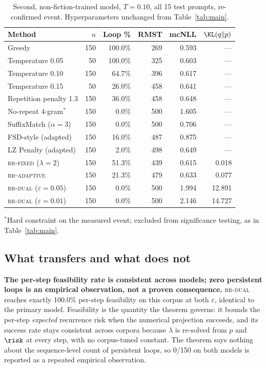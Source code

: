 \begin{table}[ht]
\centering
\caption{Second, non-fiction-trained model, $T{=}0.10$, all 15 test prompts, re-confirmed event. Hyperparameters unchanged from Table~\ref{tab:main}.}
\label{tab:generalization}
\begin{tabular}{@{}lrrrrr@{}}
\toprule
Method & $n$ & Loop \% & RMST & mcNLL & $\KL(q\Vert p)$ \\
\midrule
Greedy                      & 150 & 100.0\% & 269   & 0.593 & --- \\
Temperature 0.05             & 50  & 100.0\% & 325   & 0.603 & --- \\
Temperature 0.10             & 150 & 64.7\%  & 396   & 0.617 & --- \\
Temperature 0.15             & 50  & 26.0\%  & 458   & 0.641 & --- \\
Repetition penalty 1.3        & 150 & 36.0\%  & 458   & 0.648 & --- \\
No-repeat 4-gram$^{*}$       & 150 & 0.0\%   & 500   & 1.605 & --- \\
SuffixMatch ($\alpha{=}3$)    & 150 & 0.0\%   & 500   & 0.706 & --- \\
FSD-style (adapted)          & 150 & 16.0\%  & 487   & 0.875 & --- \\
LZ Penalty (adapted)        & 150 & 2.0\%   & 498   & 0.649 & --- \\
\textsc{rr-fixed} ($\lambda{=}2$)   & 150 & 51.3\%  & 439   & 0.615 & 0.018 \\
\textsc{rr-adaptive}          & 150 & 21.3\%  & 479   & 0.633 & 0.077 \\
\textsc{rr-dual} ($\varepsilon{=}0.05$) & 150 & 0.0\% & 500 & 1.994 & 12.891 \\
\textsc{rr-dual} ($\varepsilon{=}0.01$) & 150 & 0.0\% & 500 & 2.146 & 14.727 \\
\bottomrule
\end{tabular}

\vspace{4pt}
{\footnotesize $^{*}$Hard constraint on the measured event; excluded from significance testing, as in Table~\ref{tab:main}.}
\end{table}


\subsection{What transfers and what does not}
\textbf{The per-step feasibility rate is consistent across models; zero persistent loops is an empirical observation, not a proven consequence.} \textsc{rr-dual} reaches exactly 100.0\% per-step feasibility on this corpus at both $\varepsilon$, identical to the primary model. Feasibility is the quantity the theorem governs: it bounds the per-step \emph{expected} recurrence risk when the numerical projection succeeds, and its success rate stays consistent across corpora because $\lambda$ is re-solved from $p$ and $\risk$ at every step, with no corpus-tuned constant. The theorem says nothing about the sequence-level count of persistent loops, so 0/150 on both models is reported as a repeated empirical observation.

